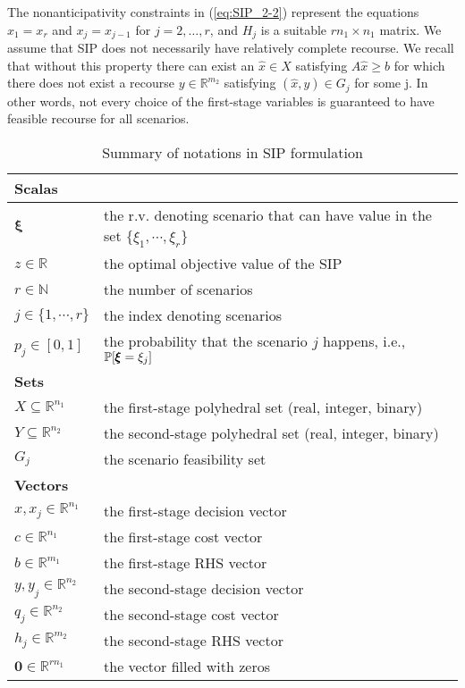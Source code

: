 The nonanticipativity constraints in (\ref{eq:SIP_2-2}) represent the equations $x_1=x_r$ and $x_j=x_{j-1}$ for $j=2,\ldots,r$, and $H_j$ is a suitable $rn_1\times n_1$ matrix. We assume that SIP does not necessarily have relatively complete recourse. We recall that without this property there can exist an $\hat{x}\in X$ satisfying $A\hat{x}\ge b$ for which there does not exist a recourse $y\in\mathbb{R}^{m_2}$ satisfying $(\hat{x},y)\in G_j$ for some j. In other words, not every choice of the first-stage variables is guaranteed to have feasible recourse for all scenarios.
\begin{table}[H]
	\caption{Summary of notations in SIP formulation}
	\label{notation:SIP}
	\resizebox{\textwidth}{!}
	{
		\begin{tabular}{ll}
			\toprule
			\textbf{Scalas}	&	\\  \midrule
			$\pmb{\xi}$	&	the r.v. denoting scenario that can have value in the set $\{\xi_1,\cdots,\xi_r\}$ 	\\			
			$z\in\mathbb{R}$ & the optimal objective value of the SIP \\ 
			$r\in\mathbb{N}$	&	the number of scenarios	\\	
			$j\in\{1,\cdots,r\}$	&	the index denoting scenarios	\\
			$p_j\in[0,1]$ & the probability that the scenario $j$ happens, i.e., $\operatorname*{\mathbb{P}}[\pmb{\xi}=\xi_j]$ \\ \midrule
			\textbf{Sets} &  \\  \midrule
			$X\subseteq\mathbb{R}^{n_1}$	&	the first-stage polyhedral set (real, integer, binary)\\
			$Y\subseteq\mathbb{R}^{n_2}$	&	the second-stage polyhedral set (real, integer, binary)\\
			$G_j$	& the scenario feasibility set\\ \midrule
			\textbf{Vectors} &   \\  \midrule
			$x,x_j\in\mathbb{R}^{n_1}$	&	the first-stage decision vector	\\
			$c\in \mathbb{R}^{n_1}$	& the first-stage cost vector\\
			$b\in\mathbb{R}^{m_1}$	& the first-stage RHS vector\\
			$y,y_j\in\mathbb{R}^{n_2}$	& the second-stage decision vector	\\
			$q_j\in\mathbb{R}^{n_2}$	& the second-stage cost vector \\
			$h_j\in\mathbb{R}^{m_2}$	& the second-stage RHS vector\\
			$\mathbf{0}\in\mathbb{R}^{rn_1}$	& the vector filled with zeros \\ \midrule

\end{tabular}}
\end{table}
